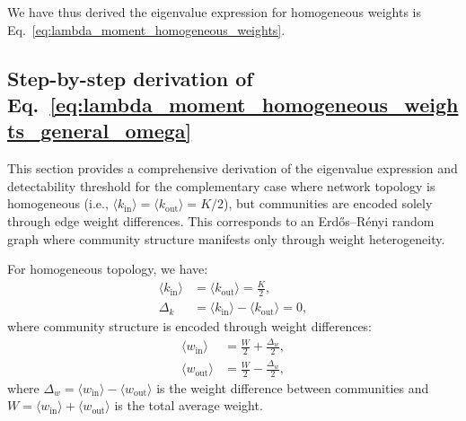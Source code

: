 \documentclass[a4paper,pre,superscriptaddress,floatfix,nofootinbib,twocolumn]{revtex4-1}
\begin{document}
We have thus derived the eigenvalue expression for homogeneous weights is Eq.~\eqref{eq:lambda_moment_homogeneous_weights}.


\subsection*{Step-by-step derivation of Eq.~\eqref{eq:lambda_moment_homogeneous_weights_general_omega}}
\label{sec:detailed_derivation_homogeneous_topology}

This section provides a comprehensive derivation of the eigenvalue expression and detectability threshold for the complementary case where network topology is homogeneous (i.e., $\langle k_{\text{in}} \rangle = \langle k_{\text{out}} \rangle = K/2$), but communities are encoded solely through edge weight differences. This corresponds to an Erd\H{o}s--R\'enyi random graph where community structure manifests only through weight heterogeneity.

For homogeneous topology, we have:
\begin{align*}
\langle k_{\text{in}} \rangle &= \langle k_{\text{out}} \rangle = \frac{K}{2},\\
\Delta_k &= \langle k_{\text{in}} \rangle - \langle k_{\text{out}} \rangle = 0,
\end{align*}
where community structure is encoded through weight differences:
\begin{align*}
\langle w_\text{in} \rangle &= \frac{W}{2} + \frac{\Delta_{w}}{2},\\
\langle w_\text{out} \rangle &= \frac{W}{2} - \frac{\Delta_{w}}{2},
\end{align*}
where $\Delta_{w} = \langle w_\text{in} \rangle - \langle w_\text{out} \rangle$ is the weight difference between communities and $W = \langle w_\text{in} \rangle + \langle w_\text{out} \rangle$ is the total average weight.
\end{document}
